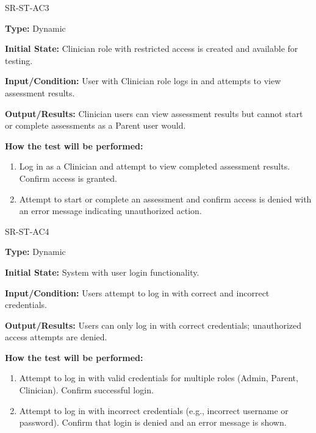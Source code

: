 \documentclass[12pt, titlepage]{article}
\begin{document}
\begin{itemize}
  \begin{item}
    SR-ST-AC3
      \begin{mdframed}[linewidth=0.5mm]
        \textbf{Type:} Dynamic \par
        \textbf{Initial State:} Clinician role with restricted access is created and available for testing. \par
        \textbf{Input/Condition:} User with Clinician role logs in and attempts to view assessment results. \par
        \textbf{Output/Results:} Clinician users can view assessment results but cannot start or 
        complete assessments as a Parent user would. \par
        \textbf{How the test will be performed:}
        \begin{enumerate}[noitemsep]
          \item Log in as a Clinician and attempt to view completed assessment results. Confirm access is granted.
          \item Attempt to start or complete an assessment and confirm access is denied with an 
          error message indicating unauthorized action.
        \end{enumerate}
      \end{mdframed}
  \end{item}

  \begin{item}
     SR-ST-AC4
    \begin{mdframed}[linewidth=0.5mm]
      \textbf{Type:} Dynamic \par
      \textbf{Initial State:} System with user login functionality. \par
      \textbf{Input/Condition:} Users attempt to log in with correct and incorrect credentials. \par
      \textbf{Output/Results:} Users can only log in with correct credentials; unauthorized access attempts are denied. \par
      \textbf{How the test will be performed:}
      \begin{enumerate}[noitemsep]
        \item Attempt to log in with valid credentials for multiple roles (Admin, Parent, Clinician). Confirm successful login.
        \item Attempt to log in with incorrect credentials (e.g., incorrect username or password). 
        Confirm that login is denied and an error message is shown.
      \end{enumerate}
    \end{mdframed}
  \end{item}


\end{itemize}
\end{document}
